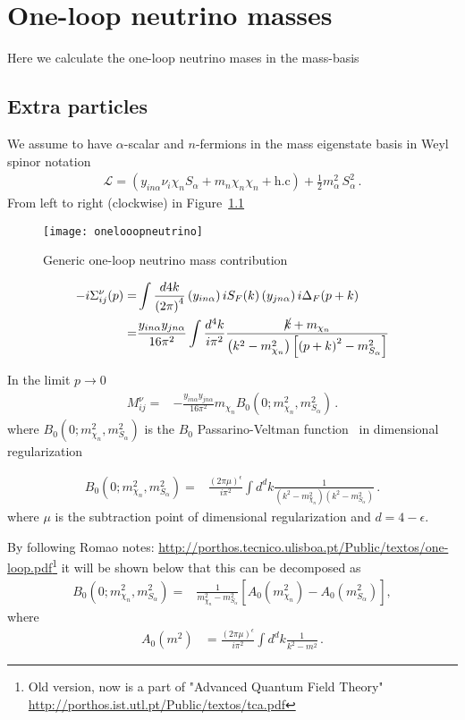 \chapter{One-loop neutrino masses}
Here we calculate the one-loop neutrino mases in the mass-basis

\section{Extra particles}
We assume to have $\alpha$-scalar  and $n$-fermions in the mass eigenstate basis in Weyl spinor notation
\begin{align}
  \mathcal{L}=\left(y_{in\alpha}\nu_{i}\chi_n S_{\alpha}+m_n \chi_n\chi_n +\text{h.c} \right)+\tfrac{1}{2}m_{\alpha}^2\,S_{\alpha}^2\,.
\end{align}
From left to right (clockwise) in Figure~\ref{fig:1lnu}
\begin{figure}
  \centering
  \texttt{[image: onelooopneutrino]}
  \caption{Generic one-loop neutrino mass contribution}
  \label{fig:1lnu}
\end{figure}
\begin{align}
-i\Sigma^{\nu}_{ij}(p)=&\int \frac{d4k}{\left( 2\pi \right)^{4}}\left(y_{in\alpha}  \right)iS_F(k) \left(y_{jn\alpha}\right)i\Delta_F(p+k) \nonumber\\
=&\frac{y_{i n\alpha}y_{j n\alpha}}{16\pi^2}\int \frac{d^4k}{i\pi^2}\frac{\cancel{k}+m_{\chi_n}}{\left(k^2-m_{\chi_n}^2  \right)\left[\left(p+k\right)^2-m_{S_\alpha}^2\right]}
\end{align}

In the limit $p\to 0$
\begin{align}
\label{eq:mnub0}
   M^{\nu}_{ij}=&-\frac{y_{i n\alpha}y_{j n\alpha}}{16\pi^2}m_{\chi_n} B_0 \left( 0;m_{\chi_n}^2,m_{S_{\alpha}}^2 \right) \,.
\end{align}
where $B_0\left
(0;m_{\chi_n}^2,m^2_{S_{\alpha}} \right)$ is the $B_0$ Passarino-Veltman function~\cite{Passarino:1978jh} in dimensional regularization 

\begin{align}
  \label{eq:mnueigi02}
  B_0 \left(0;m_{\chi_n}^2,m^2_{S_{\alpha}} \right)=&\frac{\left( 2\pi \mu \right)^{\epsilon}}{i\pi^2}\int d^dk\frac{1}{\left(k^2-m_{\chi_n}^2\right)\left(k^2-m_{S_\alpha}^2\right)}\,.
\end{align}
where $\mu$ is the subtraction point of dimensional regularization and $d=4-\epsilon$.

By following Romao notes: \url{http://porthos.tecnico.ulisboa.pt/Public/textos/one-loop.pdf}\footnote{Old version, now is a part of "Advanced Quantum Field Theory" \url{http://porthos.ist.utl.pt/Public/textos/tca.pdf}} 
it will be shown below that this can be decomposed as
\begin{align}
  \label{eq:mnueig}
  B_0 \left(0;m_{\chi_n}^2,m^2_{S_{\alpha}} \right)
            =&\frac{1}{m_{\chi_n}^2-m_{S_\alpha}^2}\left[ A_0\left(m_{\chi_n}^2\right)-A_0\left(m_{S_\alpha}^2\right)  \right],
\end{align}
where
\begin{align}
   A_{0}\left(m^{2}\right) &=\frac{(2 \pi \mu)^{\epsilon}}{i \pi^{2}} \int d^{d} k \frac{1}{k^{2}-m^{2}}\,.
\end{align}


